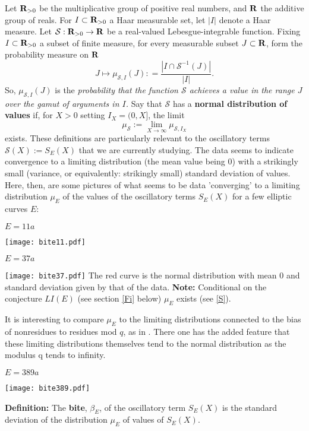 \documentclass[11pt]{article}
\theoremstyle{plain}
\theoremstyle{definition}
\numberwithin{equation}{section}
\numberwithin{figure}{section}
\numberwithin{table}{section}
\def\S{\mathcal{S}}
\def\R{{\bf R}}
\begin{document}
Let ${\R}_{>0}$ be the multiplicative group of positive real numbers, and ${\R}$ the additive group of reals. For $I \subset {\R}_{>0}$ a Haar measurable set, let $|I|$ denote a Haar measure.  Let ${\S}:{\R}_{>0} \to {\R}$ be a real-valued Lebesgue-integrable function.  Fixing $I \subset {\R}_{>0}$ a subset  of finite measure,  for every measurable subset $J\subset {\R}$, form the probability measure on ${\R}$
$$J\mapsto \mu_{{\S},I}(J): = {\frac{|I\cap {\S}^{-1}(J)|}{|I|}}.$$  So, $\mu_{{\S},I}(J)$ is the {\it probability that the function ${\S}$ achieves a value in the range $J$ over the gamut of arguments in $I$.}   Say that ${\S}$ has a {\bf normal distribution of values} if, for $X > 0$ setting $I_X= (0,X]$, the limit  $$\mu_{{\S}}:= \lim_{X \to \infty}\mu_{{\S},I_X}$$ exists. These  definitions are particularly relevant to the oscillatory terms ${\S}(X):= S_E(X)$ that we are currently studying. The data seems to indicate convergence to a limiting distribution (the  mean  value being $0$) with a strikingly small (variance, or equivalently: strikingly small) standard deviation of values.
\vskip20pt
Here, then, are some pictures  of what seems to be data 'converging' to a limiting  distribution $\mu_E$ of the values of the oscillatory terms $S_E(X)$ for a few elliptic curves $E$:
  \vskip10pt
  \centerline{ $E = 11a$}
 \vskip10pt
 \hskip100pt \texttt{[image: bite11.pdf]}
    \vskip10pt
  \centerline{ $E = 37a$}
  \vskip10pt
 \hskip100pt \texttt{[image: bite37.pdf]}
    \vskip10pt
       The red curve is the normal distribution with mean $0$ and standard deviation given by that of the data.
   \vskip10pt
    {\bf  Note: } Conditional on the conjecture $LI(E)$ (see section \ref{Fi} below) $\mu_E$ exists (see \ref{S}).

     It is interesting  to compare $\mu_E$ to the limiting distributions connected to the bias of nonresidues to residues mod $q$, as in \cite{R-S}. There one has the added feature that these limiting distributions themselves tend to the normal distribution as the modulus q tends to infinity.
  \centerline{ $E = 389a$}
  \vskip10pt
\hskip100pt  \texttt{[image: bite389.pdf]}


   {\bf Definition:}  The {\bf bite}, $\beta_E$, of the oscillatory term $S_E(X)$ is the standard deviation of the   distribution $\mu_E$ of values of $S_E(X)$.
\end{document}
